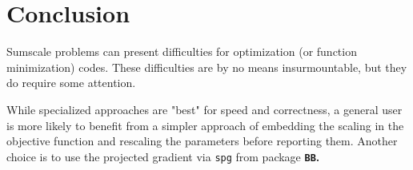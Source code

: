 \documentclass[11pt]{article}
\newcommand{\code}[1]{{\tt#1}}
\newcommand{\pkg}[1]{\bf{\tt#1}\rm }
\begin{document}
\section{Conclusion}

Sumscale problems can present difficulties for optimization (or function minimization)
codes. These difficulties are by no means insurmountable, but they do require some 
attention.

While specialized approaches are "best" for speed and correctness, a general user is more
likely to benefit from a simpler approach of embedding the scaling in the objective function
and rescaling the parameters before reporting them. Another choice is to use the projected
gradient via \code{spg} from package \pkg{BB}.




\end{document}
